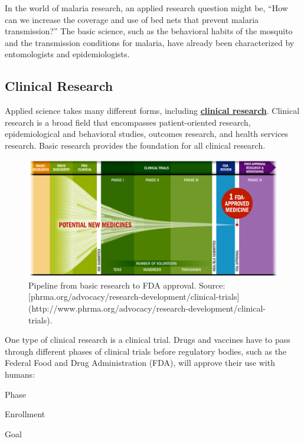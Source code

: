 \documentclass[justified,twoside,symmetric,]{tufte-book}
\let\subsubsection\subsection
\begin{document}
In the world of malaria research, an applied research question might be, ``How can we increase the coverage and use of bed nets that prevent malaria transmission?'' The basic science, such as the behavioral habits of the mosquito and the transmission conditions for malaria, have already been characterized by entomologists and epidemiologists.

\hypertarget{clinical-research}{%
\subsubsection*{Clinical Research}\label{clinical-research}}

Applied science takes many different forms, including \href{https://en.wikipedia.org/wiki/Clinical_research}{\textbf{clinical research}}. Clinical research is a broad field that encompasses patient-oriented research, epidemiological and behavioral studies, outcomes research, and health services research. Basic research provides the foundation for all clinical research.

\begin{figure}
\includegraphics{images/clinicaltrials} \caption[Pipeline from basic research to FDA approval]{Pipeline from basic research to FDA approval. Source: [phrma.org/advocacy/research-development/clinical-trials](http://www.phrma.org/advocacy/research-development/clinical-trials).}\label{fig:ctrial}
\end{figure}

One type of clinical research is a clinical trial. Drugs and vaccines have to pass through different phases of clinical trials before regulatory bodies, such as the Federal Food and Drug Administration (FDA), will approve their use with humans:

Phase

Enrollment

Goal
\end{document}

